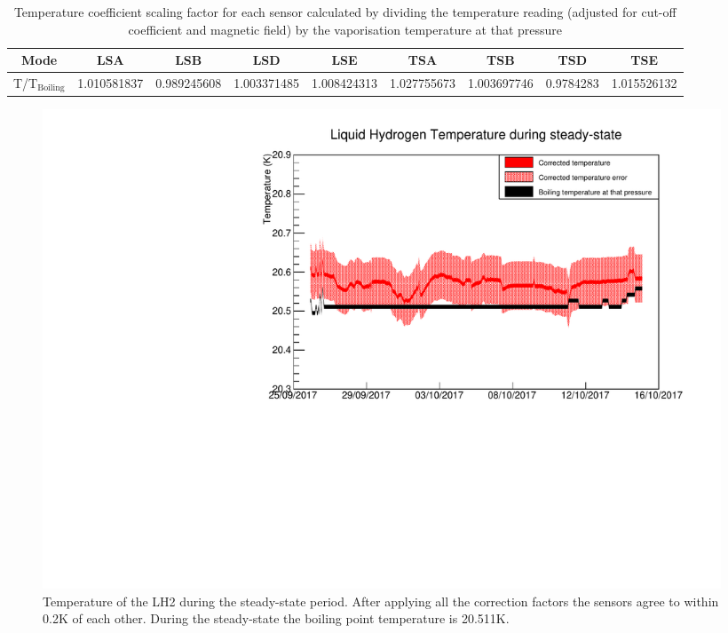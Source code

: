  \begin{table}
\scriptsize
  \caption{
    Temperature coefficient scaling factor for each sensor calculated by dividing the temperature reading (adjusted for cut-off coefficient and magnetic field) by the vaporisation temperature at that pressure
  }
  \label{tab:temperature}
  \begin{center}
    \begin{tabular}{|c c c c c c c c c|}
    \hline

Mode      & LSA & LSB & LSD & LSE & TSA & TSB & TSD & TSE     \rule{0pt}{10pt} \\
\hline
T/T${}_\textrm{Boiling}$ &  1.010581837 & 0.989245608 & 1.003371485 & 1.008424313 & 1.027755673 & 1.003697746 & 0.9784283 & 1.015526132\\

    \hline
    \end{tabular}
  \end{center}
\end{table} 

  \begin{figure}[htb!]
  \begin{center}
    \includegraphics[width=0.98\textwidth]{LH2_temperature_calibrated_steady.pdf}
  \end{center}
  \caption{Temperature of the LH2 during the steady-state period. After applying all the correction factors the sensors agree to within 0.2K of each other. During the steady-state the boiling point temperature is 20.511K.}
  \label{Fig:TempCalibrated}
\end{figure}
 
